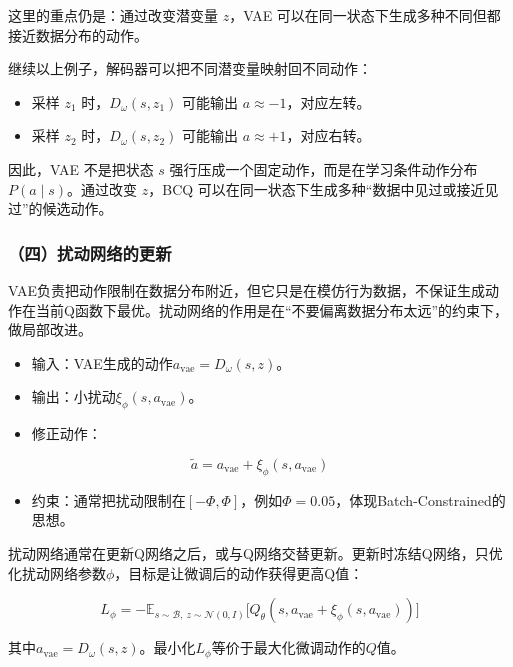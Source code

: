 这里的重点仍是：通过改变潜变量 \(z\)，VAE 可以在同一状态下生成多种不同但都接近数据分布的动作。

继续以上例子，解码器可以把不同潜变量映射回不同动作：

\begin{itemize}
\tightlist
\item
  采样 \(z_1\) 时，\(D_\omega(s,z_1)\) 可能输出 \(a\approx -1\)，对应左转。
\item
  采样 \(z_2\) 时，\(D_\omega(s,z_2)\) 可能输出 \(a\approx +1\)，对应右转。
\end{itemize}

因此，VAE 不是把状态 \(s\) 强行压成一个固定动作，而是在学习条件动作分布 \(P(a\mid s)\)。通过改变 \(z\)，BCQ 可以在同一状态下生成多种``数据中见过或接近见过''的候选动作。

\hypertarget{ux56dbux6270ux52a8ux7f51ux7edcux7684ux66f4ux65b0}{%
\subsubsection{（四）扰动网络的更新}\label{ux56dbux6270ux52a8ux7f51ux7edcux7684ux66f4ux65b0}}

VAE负责把动作限制在数据分布附近，但它只是在模仿行为数据，不保证生成动作在当前Q函数下最优。扰动网络的作用是在``不要偏离数据分布太远''的约束下，做局部改进。

\begin{itemize}
\tightlist
\item
  输入：VAE生成的动作\(a_{\mathrm{vae}}=D_\omega(s,z)\)。
\item
  输出：小扰动\(\xi_\phi(s,a_{\mathrm{vae}})\)。
\item
  修正动作：
\end{itemize}

\[
\tilde a = a_{\mathrm{vae}}+\xi_\phi(s,a_{\mathrm{vae}})
\]

\begin{itemize}
\tightlist
\item
  约束：通常把扰动限制在\([-\Phi,\Phi]\)，例如\(\Phi=0.05\)，体现Batch-Constrained的思想。
\end{itemize}

扰动网络通常在更新Q网络之后，或与Q网络交替更新。更新时冻结Q网络，只优化扰动网络参数\(\phi\)，目标是让微调后的动作获得更高Q值：

\[
L_\phi
=-\mathbb{E}_{s\sim\mathcal B,\ z\sim\mathcal{N}(0,I)}
\bigl[
Q_\theta(s,a_{\mathrm{vae}}+\xi_\phi(s,a_{\mathrm{vae}}))
\bigr]
\]

其中\(a_{\mathrm{vae}}=D_\omega(s,z)\)。最小化\(L_\phi\)等价于最大化微调动作的\(Q\)值。

